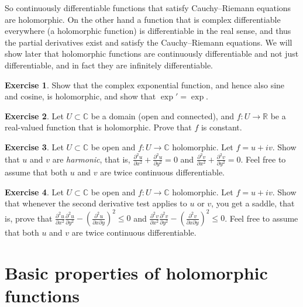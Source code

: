 \documentclass[12pt,openany]{book}
\newcommand{\C}{{\mathbb{C}}}
\newcommand{\R}{{\mathbb{R}}}
\newcommand{\myindex}[1]{#1\index{#1}}
\theoremstyle{plain}
\theoremstyle{remark}
\theoremstyle{definition}
\newenvironment{exbox}{%
    \def\FrameCommand{\vrule width 1pt \relax\hspace{10pt}}%
    \MakeFramed{\advance\hsize-\width\FrameRestore}%
}{%
    \endMakeFramed
}
\theoremstyle{exercise}
\newtheorem{exercise}{Exercise}[section]
\theoremstyle{example}
\begin{document}
So continuously differentiable functions that satisfy
Cauchy--Riemann equations are holomorphic.
On the other hand
a function that is complex differentiable everywhere (a holomorphic
function) is differentiable in the real sense,
and thus the partial derivatives exist and satisfy the Cauchy--Riemann
equations.  We will show later that holomorphic functions are
continuously differentiable and not just differentiable, and in fact they
are infinitely differentiable.

\begin{exbox}
\begin{exercise} \label{exercise:exponentialholomorphic}
Show that the complex exponential function, and hence also sine and cosine,
is holomorphic, and show that $\exp' = \exp$.
\end{exercise}

\begin{exercise}
Let $U \subset \C$ be a domain (open and connected),
and $f \colon U \to \R$ be a real-valued function that is holomorphic.
Prove that $f$ is constant.
\end{exercise}

\begin{exercise}
Let $U \subset \C$ be open and $f \colon U \to \C$ holomorphic.
Let $f = u+iv$.  Show that $u$ and $v$ are \emph{\myindex{harmonic}},
that is,
$\frac{\partial^2 u}{\partial x^2} +  \frac{\partial^2 u}{\partial y^2} = 0$
and
$\frac{\partial^2 v}{\partial x^2} +  \frac{\partial^2 v}{\partial y^2} = 0$.
Feel free to assume that both $u$ and $v$ are twice continuous
differentiable.
\end{exercise}

\begin{exercise}
Let $U \subset \C$ be open and $f \colon U \to \C$ holomorphic.
Let $f = u+iv$.  Show that whenever the second derivative test applies 
to $u$ or $v$, you get a saddle, that is, prove that
$\frac{\partial^2 u}{\partial x^2} \frac{\partial^2 u}{\partial y^2}
-{\left(\frac{\partial^2 u}{\partial x \partial y}\right)}^2 \leq 0$
and
$\frac{\partial^2 v}{\partial x^2} \frac{\partial^2 v}{\partial y^2}
-{\left(\frac{\partial^2 v}{\partial x \partial y}\right)}^2 \leq 0$.
Feel free to assume that both $u$ and $v$ are twice continuous
differentiable.
\end{exercise}
\end{exbox}



\section{Basic properties of holomorphic functions}
\end{document}
